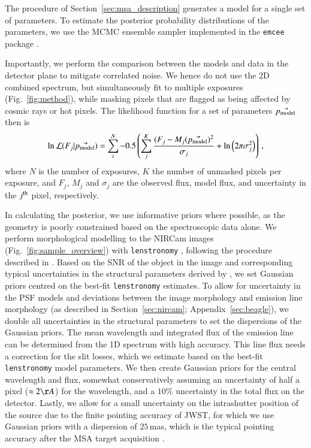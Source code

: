 \documentclass[longauth]{aa}
\begin{document}
The procedure of Section~\ref{sec:msa_description} generates a model for a single set of parameters. To estimate the posterior probability distributions of the parameters, we use the MCMC ensemble sampler implemented in the \texttt{emcee} package \citep{emcee}. 

Importantly, we perform the comparison between the models and data in the detector plane to mitigate correlated noise. We hence do not use the 2D combined spectrum, but simultaneously fit to multiple exposures (Fig.~\ref{fig:method}), while masking pixels that are flagged as being affected by cosmic rays or hot pixels. The likelihood function for a set of parameters $\vec{p_{\rm model}}$ then is
\begin{equation}
    \ln \mathcal{L}(F_j | \vec{p_{\rm model}} ) = \sum_i^N -0.5 \left( \sum_j^K \frac{(F_j - M_j(\vec{p_{\rm model}})^2}{\sigma_j} + \ln \left( 2 \pi \sigma_j^2 \right) \right )\,,
\end{equation}
where $N$ is the number of exposures, $K$ the number of unmasked pixels per exposure, and $F_j$, $M_j$ and $\sigma_j$ are the observed flux, model flux, and uncertainty in the $j^{\rm th}$ pixel, respectively.



In calculating the posterior, we use informative priors where possible, as the geometry is poorly constrained based on the spectroscopic data alone. We perform morphological modelling to the NIRCam images (Fig.~\ref{fig:sample_overview}) with \texttt{lenstronomy} \citep{Birrer2018,Birrer2021}, following the procedure described in \citet{Suess2023}. Based on the SNR of the object in the image and corresponding typical uncertainties in the structural parameters derived by \citet{vdWel2012}, we set Gaussian priors centred on the best-fit \texttt{lenstronomy} estimates. To allow for uncertainty in the PSF models and deviations between the image morphology and emission line morphology {(as described in Section~\ref{sec:nircam}; Appendix~\ref{sec:beagle})}, we double all uncertainties in the structural parameters to set the dispersions of the Gaussian priors. The mean wavelength and integrated flux of the emission line can be determined from the 1D spectrum with high accuracy. This line flux needs a correction for the slit losses, which we estimate based on the best-fit \texttt{lenstronomy} model parameters. We then create Gaussian priors for the central wavelength and flux, somewhat conservatively assuming an uncertainty of half a pixel ($\approx 2\AA$) for the wavelength, and a $10\%$ uncertainty in the total flux on the detector. Lastly, we allow for a small uncertainty on the intrashutter position of the source due to the finite pointing accuracy of JWST, for which we use Gaussian priors with a dispersion of $25\,$mas, which is the typical pointing accuracy after the MSA target acquisition \citep{Boeker2023}.
\end{document}
